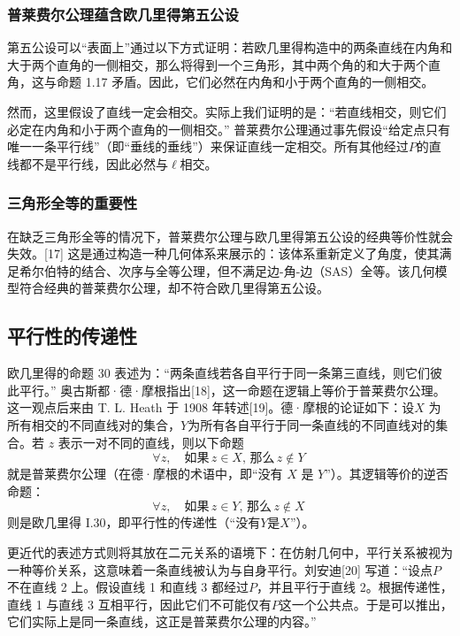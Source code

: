 \subsubsection{普莱费尔公理蕴含欧几里得第五公设}
第五公设可以“表面上”通过以下方式证明：若欧几里得构造中的两条直线在内角和大于两个直角的一侧相交，那么将得到一个三角形，其中两个角的和大于两个直角，这与命题 1.17 矛盾。因此，它们必然在内角和小于两个直角的一侧相交。

然而，这里假设了直线一定会相交。实际上我们证明的是：“若直线相交，则它们必定在内角和小于两个直角的一侧相交。” 普莱费尔公理通过事先假设“给定点只有唯一一条平行线”（即“垂线的垂线”）来保证直线一定相交。所有其他经过$P$的直线都不是平行线，因此必然与$\ell$相交。
\subsubsection{三角形全等的重要性}
在缺乏三角形全等的情况下，普莱费尔公理与欧几里得第五公设的经典等价性就会失效。[17] 这是通过构造一种几何体系来展示的：该体系重新定义了角度，使其满足希尔伯特的结合、次序与全等公理，但不满足边-角-边（SAS）全等。该几何模型符合经典的普莱费尔公理，却不符合欧几里得第五公设。
\subsection{平行性的传递性}
欧几里得的命题 30 表述为：“两条直线若各自平行于同一条第三直线，则它们彼此平行。” 奥古斯都·德·摩根指出[18]，这一命题在逻辑上等价于普莱费尔公理。这一观点后来由 T. L. Heath 于 1908 年转述[19]。德·摩根的论证如下：设$X$ 为所有相交的不同直线对的集合，$Y$为所有各自平行于同一条直线的不同直线对的集合。若 $z$ 表示一对不同的直线，则以下命题
$$
\forall z, \quad 如果 \, z \in X, \, 那么 \, z \notin Y~
$$
就是普莱费尔公理（在德·摩根的术语中，即“没有 $X$ 是 $Y$”）。其逻辑等价的逆否命题：
$$
\forall z, \quad 如果 \, z \in Y, \, 那么 \, z \notin X~
$$
则是欧几里得 I.30，即平行性的传递性（“没有$Y$是$X$”）。

更近代的表述方式则将其放在二元关系的语境下：在仿射几何中，平行关系被视为一种等价关系，这意味着一条直线被认为与自身平行。刘安迪[20] 写道：“设点$P$不在直线 2 上。假设直线 1 和直线 3 都经过$P$，并且平行于直线 2。根据传递性，直线 1 与直线 3 互相平行，因此它们不可能仅有$P$这一个公共点。于是可以推出，它们实际上是同一条直线，这正是普莱费尔公理的内容。”
